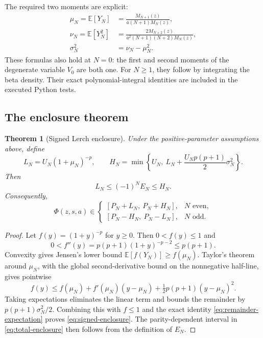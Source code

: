 \documentclass[11pt,a4paper]{article}
\newcommand{\E}{\mathbb E}
\newcommand{\PhiL}{\Phi}
\newtheorem{theorem}{Theorem}[section]
\begin{document}
The required two moments are explicit:
\begin{align}
 \mu_N=\E[Y_N]&=\frac{M_{N+1}(z)}{a(N+1)M_N(z)},\label{eq:mean}\\
 \nu_N=\E[Y_N^2]&=\frac{2M_{N+2}(z)}{a^2(N+1)(N+2)M_N(z)},\label{eq:second}\\
 \sigma_N^2&=\nu_N-\mu_N^2.\label{eq:variance}
\end{align}
These formulas also hold at $N=0$: the first and second moments of the degenerate variable $V_0$ are both one. For $N\geq1$, they follow by integrating the beta density. Their exact polynomial-integral identities are included in the executed Python tests.

\subsection{The enclosure theorem}
\begin{theorem}[Signed Lerch enclosure]\label{thm:lerch}
Under the positive-parameter assumptions above, define
\begin{equation}\label{eq:LH}
 L_N=U_N(1+\mu_N)^{-p},\qquad
 H_N=\min\left\{U_N,\ L_N+\frac{U_Np(p+1)}2\sigma_N^2\right\}.
\end{equation}
Then
\begin{equation}\label{eq:signed-enclosure}
 \boxed{\quad L_N\leq(-1)^NE_N\leq H_N.\quad}
\end{equation}
Consequently,
\begin{equation}\label{eq:total-enclosure}
 \PhiL(z,s,a)\in
 \begin{cases}
 [P_N+L_N,\ P_N+H_N],&N\text{ even},\\
 [P_N-H_N,\ P_N-L_N],&N\text{ odd}.
 \end{cases}
\end{equation}
\end{theorem}
\begin{proof}
Let $f(y)=(1+y)^{-p}$ for $y\geq0$. Then $0<f(y)\leq1$ and
\[
 0<f''(y)=p(p+1)(1+y)^{-p-2}\leq p(p+1).
\]
Convexity gives Jensen's lower bound $\E[f(Y_N)]\geq f(\mu_N)$. Taylor's theorem around $\mu_N$, with the global second-derivative bound on the nonnegative half-line, gives pointwise
\[
 f(y)\leq f(\mu_N)+f'(\mu_N)(y-\mu_N)
          +\tfrac12p(p+1)(y-\mu_N)^2.
\]
Taking expectations eliminates the linear term and bounds the remainder by $p(p+1)\sigma_N^2/2$. Combining this with $f\leq1$ and the exact identity \eqref{eq:remainder-expectation} proves \eqref{eq:signed-enclosure}. The parity-dependent interval in \eqref{eq:total-enclosure} then follows from the definition of $E_N$.
\end{proof}
\end{document}
